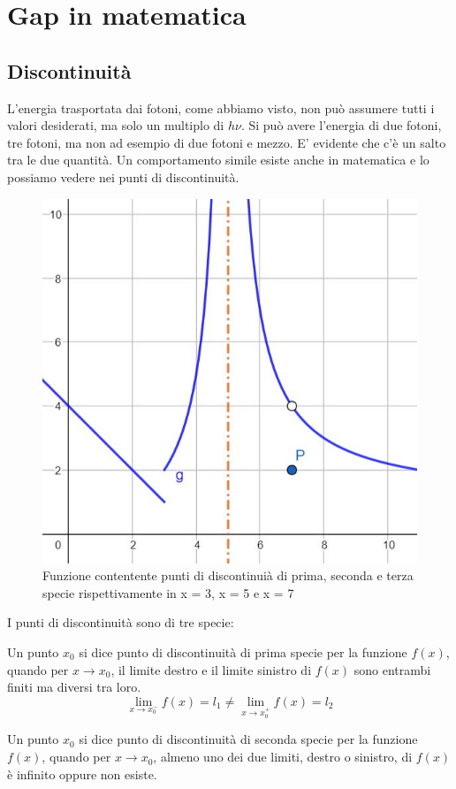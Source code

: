 \documentclass[12pt,twoside]{report}
\begin{document}
\chapter{Gap in matematica}
\section{Discontinuità}
\par{L'energia trasportata dai fotoni, come abbiamo visto, non può assumere tutti i valori desiderati, ma solo un multiplo di $ h\nu$. Si può avere l'energia di due fotoni, tre fotoni, ma non ad esempio di due fotoni e mezzo. E' evidente che c'è un salto tra le due quantità. Un comportamento simile esiste anche in matematica e lo possiamo vedere nei punti di discontinuità.}

\begin{figure}[!h]
\centering
\includegraphics[width = 0.5\hsize]{./figures/disco}
\caption{Funzione contentente punti di discontinuià di prima, seconda e terza specie rispettivamente in x = 3, x = 5 e x = 7}
\label{fig:logo}
\end{figure}

\par{I punti di discontinuità sono di tre specie:}


\begin{definition}
Un punto $x_0$ si dice punto di discontinuità di prima specie per la funzione $f(x)$, quando per $x\to x_0$, il limite destro e il limite sinistro di $f(x)$ sono entrambi finiti ma diversi tra loro. 
$$ \lim_{x\to x_0^-}f(x) = l_1 \neq \lim_{x\to x_0^+}f(x) = l_2 $$
\end{definition}

\begin{definition}
Un punto $x_0$ si dice punto di discontinuità di seconda specie per la funzione $f(x)$, quando per $x\to x_0$, almeno uno dei due limiti, destro o sinistro, di $f(x)$ è infinito oppure non esiste. 
\end{definition}
\end{document}
